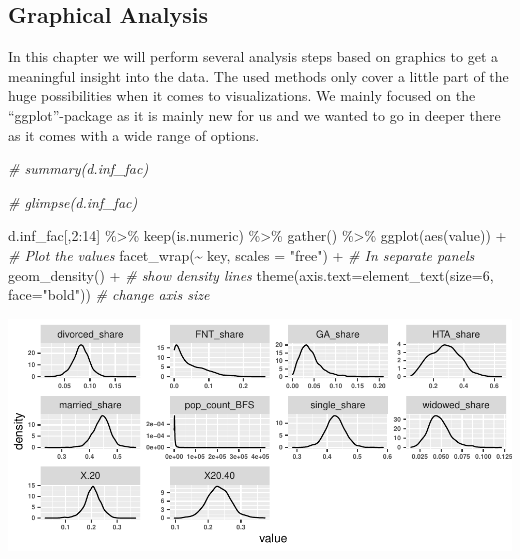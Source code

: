 \documentclass[
]{article}
\newenvironment{Shaded}{\begin{snugshade}}{\end{snugshade}}
\newcommand{\AttributeTok}[1]{\textcolor[rgb]{0.77,0.63,0.00}{#1}}
\newcommand{\CommentTok}[1]{\textcolor[rgb]{0.56,0.35,0.01}{\textit{#1}}}
\newcommand{\DecValTok}[1]{\textcolor[rgb]{0.00,0.00,0.81}{#1}}
\newcommand{\FunctionTok}[1]{\textcolor[rgb]{0.00,0.00,0.00}{#1}}
\newcommand{\NormalTok}[1]{#1}
\newcommand{\SpecialCharTok}[1]{\textcolor[rgb]{0.00,0.00,0.00}{#1}}
\newcommand{\StringTok}[1]{\textcolor[rgb]{0.31,0.60,0.02}{#1}}
\begin{document}
\hypertarget{graphical-analysis}{%
\subsection{Graphical Analysis}\label{graphical-analysis}}

In this chapter we will perform several analysis steps based on graphics
to get a meaningful insight into the data. The used methods only cover a
little part of the huge possibilities when it comes to visualizations.
We mainly focused on the ``ggplot''-package as it is mainly new for us
and we wanted to go in deeper there as it comes with a wide range of
options.

\begin{Shaded}
\begin{Highlighting}[]
\CommentTok{\# summary(d.inf\_fac)}

\CommentTok{\# glimpse(d.inf\_fac)}

\NormalTok{d.inf\_fac[,}\DecValTok{2}\SpecialCharTok{:}\DecValTok{14}\NormalTok{] }\SpecialCharTok{\%\textgreater{}\%}
  \FunctionTok{keep}\NormalTok{(is.numeric) }\SpecialCharTok{\%\textgreater{}\%}
  \FunctionTok{gather}\NormalTok{() }\SpecialCharTok{\%\textgreater{}\%}
  \FunctionTok{ggplot}\NormalTok{(}\FunctionTok{aes}\NormalTok{(value))  }\SpecialCharTok{+}                   \CommentTok{\# Plot the values}
    \FunctionTok{facet\_wrap}\NormalTok{(}\SpecialCharTok{\textasciitilde{}}\NormalTok{ key, }\AttributeTok{scales =} \StringTok{"free"}\NormalTok{) }\SpecialCharTok{+}  \CommentTok{\# In separate panels}
    \FunctionTok{geom\_density}\NormalTok{() }\SpecialCharTok{+}                      \CommentTok{\# show density lines}
    \FunctionTok{theme}\NormalTok{(}\AttributeTok{axis.text=}\FunctionTok{element\_text}\NormalTok{(}\AttributeTok{size=}\DecValTok{6}\NormalTok{, }\AttributeTok{face=}\StringTok{"bold"}\NormalTok{)) }\CommentTok{\# change axis size}
\end{Highlighting}
\end{Shaded}

\includegraphics{Lin_Mod_Clus_Analysis_files/figure-latex/unnamed-chunk-4-1.pdf}
\end{document}
